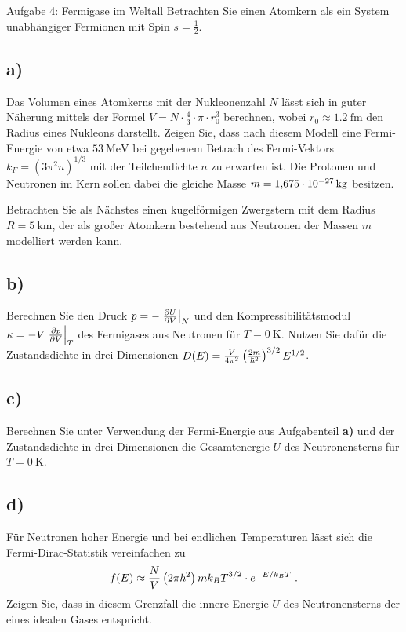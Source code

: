 \begin{aufgabe}{Aufgabe 4: Fermigase im Weltall}
    Betrachten Sie einen Atomkern als ein System unabhängiger Fermionen mit Spin $s = \frac{1}{2}$.

    \subsection{a)}
    Das Volumen eines Atomkerns mit der Nukleonenzahl $N$ lässt sich in guter Näherung mittels der Formel
    $V = N \cdot \frac{4}{3} \cdot \pi \cdot r_0^3$
    berechnen,
    wobei $r_0 \approx \SI{1.2}{\femto\meter}$ den Radius eines Nukleons darstellt.
    Zeigen Sie, dass nach diesem Modell eine Fermi-Energie von etwa $\SI{53}{\mega\electronvolt}$
    bei gegebenem Betrach des Fermi-Vektors $k_F = (3\pi^2 n)^{1/3}$ mit der Teilchendichte $n$
    zu erwarten ist.
    Die Protonen und Neutronen im Kern sollen dabei die gleiche Masse $m = \SI{1.675E-27}{\kilo\gram}$ besitzen.


    Betrachten Sie als Nächstes einen kugelförmigen Zwergstern mit dem Radius $R = \SI{5}{\kilo\meter}$,
    der als großer Atomkern bestehend aus Neutronen der Massen $m$ modelliert werden kann.

    \subsection{b)}
    Berechnen Sie den Druck $p = - \left.\frac{\partial U}{\partial V}\right\rvert_{N}$ und den Kompressibilitätsmodul $\kappa = -V \left.\frac{\partial p}{\partial V}\right\rvert_{T}$ des Fermigases aus Neutronen für $T = \SI{0}{\kelvin}$.
    Nutzen Sie dafür die Zustandsdichte in drei Dimensionen $D(E) = \frac{V}{4\pi^2} \left(\frac{2m}{\hbar^2}\right)^{3/2} E^{1/2}$.

    \subsection{c)}
    Berechnen Sie
    unter Verwendung der Fermi-Energie aus Aufgabenteil \textbf{a)} und der Zustandsdichte in drei Dimensionen
    die Gesamtenergie $U$ des Neutronensterns für $T = \SI{0}{\kelvin}$.

    \subsection{d)}
    Für Neutronen hoher Energie und bei endlichen Temperaturen lässt sich die Fermi-Dirac-Statistik vereinfachen zu
    \[
        f(E) \approx \frac{N}{V} \left(2\pi\hbar^2\right){m k_B T}^{3/2} \cdot e^{-E / k_B T} \;.
    \]
    Zeigen Sie, dass in diesem Grenzfall die innere Energie $U$ des Neutronensterns der eines idealen Gases entspricht.
\end{aufgabe}


